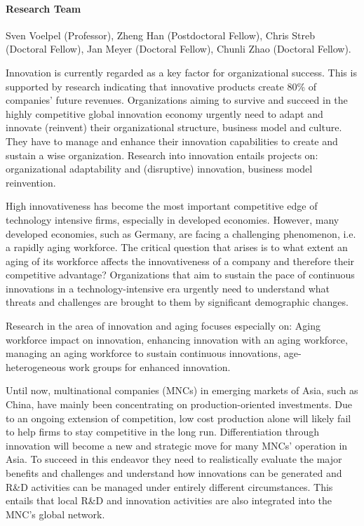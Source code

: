 
\paragraph{Research Team}
Sven Voelpel (Professor), Zheng Han (Postdoctoral Fellow), Chris Streb (Doctoral Fellow), Jan Meyer (Doctoral Fellow), Chunli Zhao (Doctoral Fellow).

 Innovation is currently regarded as a key factor for organizational success. This is supported by research indicating that innovative products create 80\% of companies' future revenues. Organizations aiming to survive and succeed in the highly competitive global innovation economy urgently need to adapt and innovate (reinvent) their organizational structure, business model and culture. They have to manage and enhance their innovation capabilities to create and sustain a wise organization. Research into innovation entails projects on: organizational adaptability and (disruptive) innovation, business model reinvention.

 High innovativeness has become the most important competitive edge of technology intensive firms, especially in developed economies. However, many developed economies, such as Germany, are facing a challenging phenomenon, i.e. a rapidly aging workforce. The critical question that arises is to what extent an aging of its workforce affects the innovativeness of a company and therefore their competitive advantage? Organizations that aim to sustain the pace of continuous innovations in a technology-intensive era urgently need to understand what threats and challenges are brought to them by significant demographic changes.

 Research in the area of innovation and aging focuses especially on: Aging workforce impact on innovation, enhancing innovation with an aging workforce, managing an aging workforce to sustain continuous innovations, age-heterogeneous work groups for enhanced innovation. 

 Until now, multinational companies (MNCs) in emerging markets of Asia, such as China, have mainly been concentrating on production-oriented investments. Due to an ongoing extension of competition, low cost production alone will likely fail to help firms to stay competitive in the long run. Differentiation through innovation will become a new and strategic move for many MNCs' operation in Asia. To succeed in this endeavor they need to realistically evaluate the major benefits and challenges and understand how innovations can be generated and R\&D activities can be managed under entirely different circumstances. This entails that local R\&D and innovation activities are also integrated into the MNC's global network.

